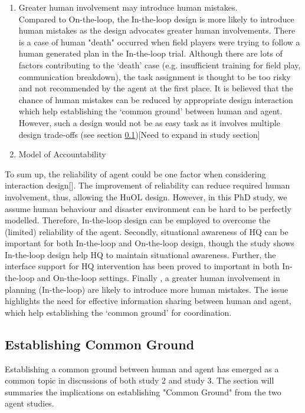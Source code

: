 \begin{enumerate}
\item Greater human involvement may introduce human mistakes. \\
Compared to On-the-loop, the In-the-loop design is more likely to introduce human mistakes as the design advocates greater human involvements. There is a case of  human "death" occurred  when field players were trying to follow a human generated plan in the In-the-loop trial.  Although there are lots of factors contributing to the `death' case (e.g. insufficient training for field play, communication breakdown), the task assignment is thought to be too risky and not recommended by the agent at the first place. It is believed that the chance of human mistakes can be reduced by appropriate design interaction which help establishing the `common ground' between human and agent. However, such a design would not be as easy task as it involves multiple design trade-offs  (see section \ref{sec:conclusionCG})[Need to expand in study section]\\

\item Model of Accountability
\end{enumerate}

To sum up, the reliability of agent could be one factor when considering interaction design[]. The improvement of reliability can reduce required human involvement, thus, allowing the HuOL design. However, in this PhD study, we assume human behaviour and disaster environment can be hard to be perfectly modelled. Therefore, In-the-loop design can be employed to overcome the (limited) reliability of the agent. Secondly, situational awareness of HQ can be important for both In-the-loop and On-the-loop design, though the study shows In-the-loop design help HQ to maintain situational awareness. Further, the interface support for HQ intervention has been proved to important in both In-the-loop and On-the-loop settings. Finally , a greater human involvement in planning (In-the-loop) are likely to introduce more human mistakes. The issue highlights the need for effective information sharing between human and agent, which help establishing the `common ground' for coordination. \\


\subsection{Establishing Common Ground} \label{sec:conclusionCG}
Establishing a common ground between human and agent has emerged as a common topic in discussions of both study 2 and study 3. The section will summaries the implications on establishing "Common Ground" from the two agent studies. \\

